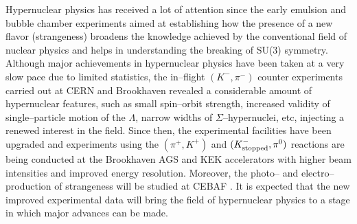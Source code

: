 Hypernuclear physics
has received a lot of attention since the early emulsion and bubble
chamber experiments
\cite{juric}
aimed at establishing how the
presence of
a new flavor (strangeness) broadens the knowledge achieved by the
conventional field of nuclear physics and helps in understanding the
breaking of SU(3) symmetry.
Although
major achievements in hypernuclear physics have been taken at a very
slow pace due to limited statistics,
the in--flight $(K^-,\pi^-)$ counter experiments carried out at
CERN \cite{bertini,bruckner} and Brookhaven  \cite{chrien} 
revealed a
considerable amount of hypernuclear
features, such as small spin--orbit strength, increased validity of
single--particle motion of the $\Lambda$, narrow widths
of $\Sigma$--hypernuclei, etc,
injecting
a renewed interest in the field.  
Since then, the experimental facilities have been upgraded and
experiments using the $(\pi^+,K^+)$ and $(K^-_{\rm stopped},\pi^0)$
reactions are being conducted at the Brookhaven AGS and KEK
accelerators with higher beam intensities and improved energy
resolution. Moreover, the photo-- and electro--production of strangeness
will be studied at CEBAF \cite{CEBAF}. It is expected
that the new improved
experimental data will bring the field of hypernuclear physics to a
stage in which major advances can be made.

